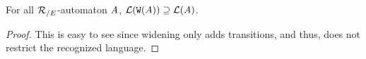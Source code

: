 \begin{lemma}
  For all ${\mathcal R_{/E}}$-automaton $\mathit A$, $\mathcal{L}(\mathtt{W}(\mathit A)) \supseteq \mathcal{L}(\mathit A)$.
\end{lemma}
\begin{proof}
This is easy to see since widening only adds transitions, and thus, does
not restrict the recognized language.
\end{proof}








  
